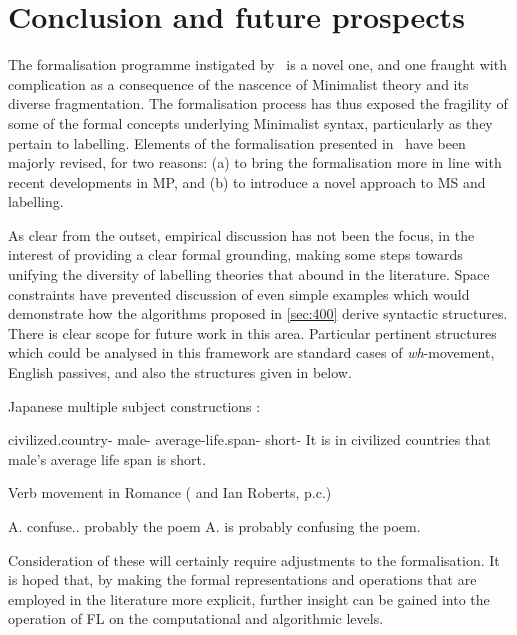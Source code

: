 \section{Conclusion and future prospects}\label{sec:500}

The formalisation programme instigated by \CS\ is a novel one, and one fraught with complication as a consequence of the nascence of Minimalist theory and its diverse fragmentation. The formalisation process has thus exposed the fragility of some of the formal concepts underlying Minimalist syntax, particularly as they pertain to labelling. Elements of the formalisation presented in \CS\ have been majorly revised, for two reasons: (a) to bring the formalisation more in line with recent developments in MP, and (b) to introduce a novel approach to MS and labelling.

As clear from the outset, empirical discussion has not been the focus, in the interest of providing a clear formal grounding, making some steps towards unifying the diversity of labelling theories that abound in the literature. Space constraints have prevented discussion of even simple examples which would demonstrate how the algorithms proposed in \autoref{sec:400} derive syntactic structures. There is clear scope for future work in this area. Particular pertinent structures which could be analysed in this framework are standard cases of \textit{wh}-movement, English passives, and also the structures given in  below.

\begin{subexamples}\label{ex:empirical}
    \item\label{ex:japsubj} 
        Japanese multiple subject constructions \parencite{KunoS_1973,SaitoM_2016,EpsteinSD.etal_2020}:

                {civilized.country-\NOM{} male-\NOM{} average-life.span-\NOM{} short-\PRS{}}
                {It is in civilized countries that male’s average life span is short.}

        \parencite[example from][131]{SaitoM_2016}

    \item\label{ex:romverb}
        Verb movement in Romance ( and Ian Roberts, p.c.)

                {A. confuse.\TSG.\PRS{} probably {} the poem}
                {A. is probably confusing the poem.}

        \parencite[example from][63]{SchifanoN_2018}

\end{subexamples}

Consideration of these will certainly require adjustments to the formalisation. It is hoped that, by making the formal representations and operations that are employed in the literature more explicit, further insight can be gained into the operation of FL on the computational and algorithmic levels.
